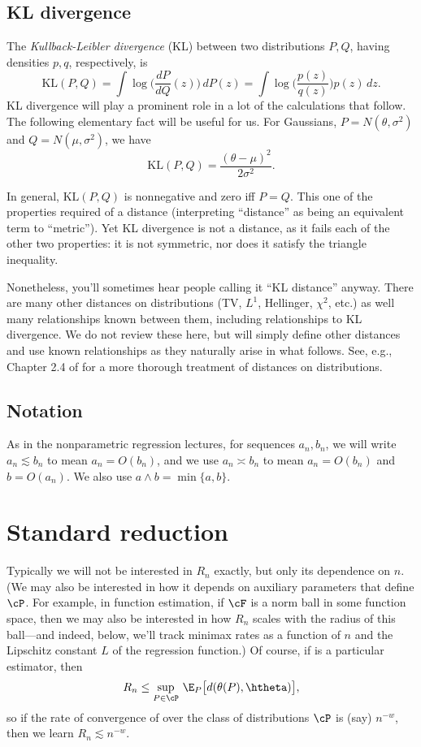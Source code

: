 \documentclass{article}
\begin{document}
\subsection{KL divergence}

\def\KL{\mathrm{KL}}

The \emph{Kullback-Leibler divergence} (KL) between two distributions $P,Q$,
having densities $p,q$, respectively, is 
\[
\KL(P,Q) = \int \log\bigg( \frac{dP}{dQ}(z) \bigg) \, dP(z)
= \int \log\bigg( \frac{p(z)}{q(z)} \bigg) p(z) \, dz.
\]
KL divergence will play a prominent role in a lot of the calculations that
follow. The following elementary fact will be useful for us. For Gaussians, $P = 
N(\theta, \sigma^2)$ and $Q = N(\mu, \sigma^2)$, we have  
\[
\KL(P, Q) = \frac{(\theta-\mu)^2}{2\sigma^2}.
\]

In general, $\KL(P,Q)$ is nonnegative and zero iff $P=Q$. This one of the
properties required of a distance (interpreting ``distance'' as being an
equivalent term to ``metric''). Yet KL divergence is not a distance, as it fails
each of the other two properties: it is not symmetric, nor does it satisfy the
triangle inequality.

Nonetheless, you'll sometimes hear people calling it ``KL distance''
anyway. There are many other distances on distributions (TV, $L^1$, Hellinger,
$\chi^2$, etc.) as well many relationships known between them, including
relationships to KL divergence. We do not review these here, but will simply
define other distances and use known relationships as they naturally arise in
what follows. See, e.g., Chapter 2.4 of \citet{tsybakov2009introduction} for a
more thorough treatment of distances on distributions.     

\subsection{Notation}

As in the nonparametric regression lectures, for sequences $a_n,b_n$, we will
write $a_n \lesssim b_n$ to mean $a_n = O(b_n)$, and we use $a_n \asymp b_n$ to
mean $a_n = O(b_n)$ and $b = O(a_n)$. We also use $a \wedge b = \min\{a,b\}$. 

\section{Standard reduction}

Typically we will not be interested in $R_n$ exactly, but only its dependence on
$n$. (We may also be interested in how it depends on auxiliary parameters that
define $\cP$. For example, in function estimation, if $\cF$ is a norm ball in
some function space, then we may also be interested in how $R_n$ scales with the
radius of this ball---and indeed, below, we'll track minimax rates as a function
of $n$ and the Lipschitz constant $L$ of the regression function.)  Of course,
if \smash{$\htheta$} is a particular estimator, then
\[
R_n \leq \sup_{P \in \cP} \, \E_P \big[ d(\theta(P), \htheta) \big], 
\]
so if the rate of convergence of \smash{$\htheta$} over the class of
distributions $\cP$ is (say) $n^{-w}$, then we learn $R_n\lesssim n^{-w}$.  
\end{document}
